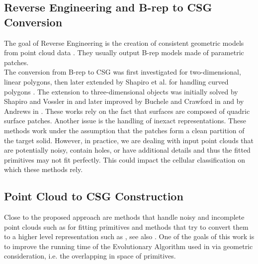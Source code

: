 \subsection{Reverse Engineering and B-rep to CSG Conversion}
The goal of Reverse Engineering is the creation of consistent geometric models from point cloud data \cite{VMC97,BMV01}. 
They usually output B-rep models made of parametric patches.
\\
The conversion from B-rep to CSG was first investigated 
for two-dimensional, linear polygons, then 
later extended by Shapiro et al. for handling curved polygons \cite{shapiro1991efficient, shapiro2001convex}. 
The extension to three-dimensional objects was initially solved 
by Shapiro and Vossler in 
\cite{shapiro1991construction, shapiro1993separation} 
and later improved by Buchele and Crawford in \cite{buchele2004three} and by Andrews in \cite{andrews2013user}. 
These works rely on the fact that surfaces are composed of quadric surface patches. 
Another issue is the handling of inexact representations. 
These methods work under the assumption that the patches form a clean partition of the 
target solid. However, in practice, we are dealing with input point clouds that are potentially 
noisy, contain holes, or have additional details and thus the fitted primitives may not fit perfectly. 
This could impact the cellular classification on which these methods rely. 

\subsection{Point Cloud to CSG Construction}
\label{sec:pipeline}
Close to the proposed approach are methods that handle noisy and incomplete point clouds 
such as \cite{schnabel2007efficient} for fitting primitives and methods that try to convert them to a higher level representation such as \cite{fayolle2016evolutionary}, see also \cite[Sections~7 and 8]{berger2017survey}. 
One of the goals of this work is to improve the running time of the Evolutionary Algorithm used in \cite{fayolle2016evolutionary} via geometric consideration, i.e. the overlapping in space of primitives.

